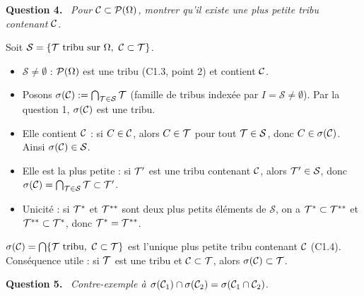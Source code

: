 \documentclass[11pt,a4paper]{article}
\newcommand{\question}[1]{\par\medskip\noindent\textbf{Question #1.}~}
\begin{document}
\begin{exo}
\question{4} \emph{Pour $\mathcal{C}\subset\mathcal{P}(\Omega)$, montrer qu'il existe une plus petite tribu contenant $\mathcal{C}$.}

Soit $\mathcal S=\{\mathcal{T}\ \text{tribu sur }\Omega,\ \mathcal{C}\subset\mathcal{T}\}$.
\begin{itemize}
  \item $\mathcal S\neq\emptyset$ : $\mathcal{P}(\Omega)$ est une tribu (C1.3, point 2) et contient $\mathcal{C}$.
  \item Posons $\sigma(\mathcal{C}):=\bigcap_{\mathcal{T}\in\mathcal S}\mathcal{T}$ (famille de tribus indexée par $I=\mathcal S\neq\emptyset$).
  Par la question 1, $\sigma(\mathcal{C})$ est une tribu.
  \item Elle contient $\mathcal{C}$ : si $C\in\mathcal{C}$, alors $C\in\mathcal{T}$ pour tout $\mathcal{T}\in\mathcal S$, donc $C\in\sigma(\mathcal{C})$. Ainsi $\sigma(\mathcal{C})\in\mathcal S$.
  \item Elle est la plus petite : si $\mathcal{T}'$ est une tribu contenant $\mathcal{C}$, alors $\mathcal{T}'\in\mathcal S$, donc $\sigma(\mathcal{C})=\bigcap_{\mathcal{T}\in\mathcal S}\mathcal{T}\subset\mathcal{T}'$.
  \item Unicité : si $\mathcal{T}^*$ et $\mathcal{T}^{**}$ sont deux plus petits éléments de $\mathcal S$, on a $\mathcal{T}^*\subset\mathcal{T}^{**}$ et $\mathcal{T}^{**}\subset\mathcal{T}^*$, donc $\mathcal{T}^*=\mathcal{T}^{**}$.
\end{itemize}
\begin{resultat}
$\sigma(\Cc)=\bigcap\{\Tc\ \text{tribu},\ \Cc\subset\Tc\}$ est l'unique plus petite tribu contenant $\mathcal{C}$ (C1.4).
Conséquence utile : si $\mathcal{T}$ est une tribu et $\mathcal{C}\subset\mathcal{T}$, alors $\sigma(\mathcal{C})\subset\mathcal{T}$.
\end{resultat}

\question{5} \emph{Contre-exemple à $\sigma(\mathcal{C}_1)\cap\sigma(\mathcal{C}_2)=\sigma(\mathcal{C}_1\cap\mathcal{C}_2)$.}


\end{exo}
\end{document}
